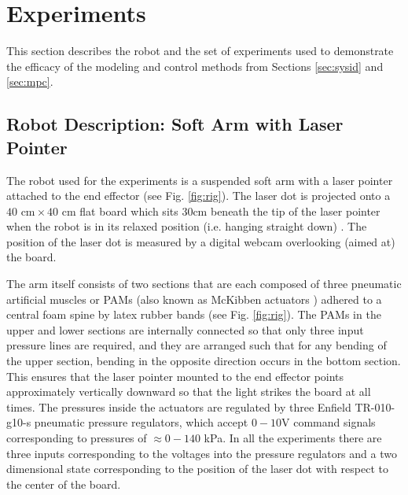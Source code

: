 \section{Experiments}
\label{sec:experiments}

This section describes the robot and the set of experiments used to demonstrate the efficacy of the modeling and control methods from Sections \ref{sec:sysid} and \ref{sec:mpc}.
  

\subsection{Robot Description: Soft Arm with Laser Pointer}
\label{sec:robot}

The robot used for the experiments is a suspended soft arm with a laser pointer attached to the end effector (see Fig. \ref{fig:rig}). 
The laser dot is projected onto a ${40\text{ cm} \times 40\text{ cm}}$ flat board which sits $30\text{cm}$ beneath the tip of the laser pointer when the robot is in its relaxed position (i.e. hanging straight down) .
The position of the laser dot is measured by a digital webcam overlooking (aimed at) the board.

The arm itself consists of two sections that are each composed of three pneumatic artificial muscles or PAMs (also known as McKibben actuators \cite{tondu2012modelling}) adhered to a central foam spine by latex rubber bands (see Fig. \ref{fig:rig}).
The PAMs in the upper and lower sections are internally connected so that only three input pressure lines are required, and
they are arranged such that for any bending of the upper section, bending in the opposite direction occurs in the bottom section.
This ensures that the laser pointer mounted to the end effector points approximately vertically downward so that the light strikes the board at all times.
The pressures inside the actuators are regulated by three Enfield TR-010-g10-s pneumatic pressure regulators, which accept ${0-10}$V command signals corresponding to pressures of ${ \approx 0 - 140 }$ kPa.
In all the experiments there are three inputs corresponding to the voltages into the pressure regulators and a two dimensional state corresponding to the position of the laser dot with respect to the center of the board.

